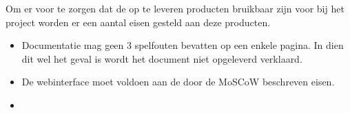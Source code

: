 \subtitle{Kwaliteitseisen op te leveren producten}
Om er voor te zorgen dat de op te leveren producten bruikbaar zijn voor bij het project worden er een aantal eisen gesteld aan deze producten.

\begin{itemize}
	\item Documentatie mag geen 3 spelfouten bevatten op een enkele pagina. In dien dit wel het geval is wordt het document niet opgeleverd verklaard.
	\item De webinterface moet voldoen aan de door de MoSCoW beschreven eisen.
	\item 
\end{itemize}


